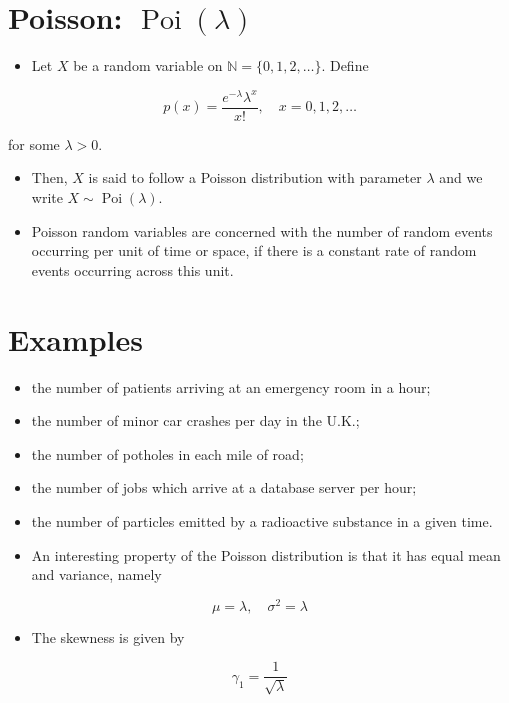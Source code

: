 \documentclass[10pt]{article}
\begin{document}
\section*{Poisson: $\operatorname{Poi}(\lambda)$}
\begin{itemize}
  \item Let $X$ be a random variable on $\mathbb{N}=\{0,1,2, \ldots\}$. Define
\end{itemize}

$$
p(x)=\frac{e^{-\lambda} \lambda^{x}}{x!}, \quad x=0,1,2, \ldots
$$

for some $\lambda>0$.

\begin{itemize}
  \item Then, $X$ is said to follow a Poisson distribution with parameter $\lambda$ and we write $X \sim \operatorname{Poi}(\lambda)$.
  \item Poisson random variables are concerned with the number of random events occurring per unit of time or space, if there is a constant rate of random events occurring across this unit.
\end{itemize}

\section*{Examples}
\begin{itemize}
  \item the number of patients arriving at an emergency room in a hour;
  \item the number of minor car crashes per day in the U.K.;
  \item the number of potholes in each mile of road;
  \item the number of jobs which arrive at a database server per hour;
  \item the number of particles emitted by a radioactive substance in a given time.
  \item An interesting property of the Poisson distribution is that it has equal mean and variance, namely
\end{itemize}

$$
\mu=\lambda, \quad \sigma^{2}=\lambda
$$

\begin{itemize}
  \item The skewness is given by
\end{itemize}

$$
\gamma_{1}=\frac{1}{\sqrt{\lambda}}
$$
\end{document}
